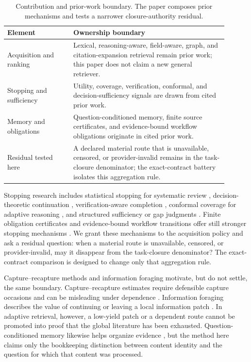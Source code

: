 \documentclass[a4paper,fleqn]{cas-sc}
\theoremstyle{definition}
\begin{document}
\begin{table}[t]
\centering
\small
\begin{tabular}{p{0.27\linewidth}p{0.63\linewidth}}
\hline
Element & Ownership boundary \\
\hline
Acquisition and ranking & Lexical, reasoning-aware, field-aware, graph, and
citation-expansion retrieval remain prior work; this paper does not claim a new
general retriever. \\
Stopping and sufficiency & Utility, coverage, verification, conformal, and
decision-sufficiency signals are drawn from cited prior work. \\
Memory and obligations & Question-conditioned memory, finite source
certificates, and evidence-bound workflow obligations originate in cited prior
work. \\
Residual tested here & A declared material route that is unavailable,
censored, or provider-invalid remains in the task-closure denominator; the
exact-contract battery isolates this aggregation rule. \\
\hline
\end{tabular}
\caption{Contribution and prior-work boundary. The paper composes prior mechanisms
and tests a narrower closure-authority residual.}
\label{tab:ownership-boundary}
\end{table}

Stopping research includes statistical stopping for systematic review
\cite{callaghan2020stopping,li2020whentostop,yang2021heuristicstopping},
decision-theoretic continuation \cite{decisionstop2026,deepcontrol2026},
verification-aware completion \cite{halt2026,donotstopearly2026}, conformal
coverage for adaptive reasoning \cite{micp2026}, and structured sufficiency or
gap judgments \cite{confidencebasedstop2026,multiragstop2026}. Finite
obligation certificates and evidence-bound workflow transitions offer still
stronger stopping mechanisms \cite{knowplan2026,icore2026}. We grant these
mechanisms to the acquisition policy and ask a residual question: when a
material route is unavailable, censored, or provider-invalid, may it disappear
from the task-closure denominator? The exact-contract comparison is designed to
change only that aggregation rule.

Capture--recapture methods and information foraging motivate, but do not settle,
the same boundary. Capture--recapture estimates require defensible capture
occasions and can be misleading under dependence
\cite{kastner2009capturerecapture,rucker2011boosting}. Information foraging
describes the value of continuing or leaving a local information patch
\cite{pirolli1995foragingchi,pirolli1999foraging}. In adaptive retrieval,
however, a low-yield patch or a dependent route cannot be promoted into proof
that the global literature has been exhausted. Question-conditioned memory
likewise helps organize evidence \cite{memchain2026}, but the method here claims
only the bookkeeping distinction between content identity and the question for
which that content was processed.
\end{document}
